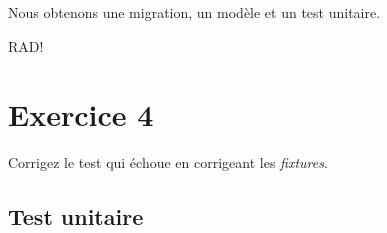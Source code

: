 Nous obtenons une migration, un modèle et un test unitaire.

\begin{english}

\begin{Shaded}
\begin{Highlighting}[]
\NormalTok{$ }\KeywordTok{\textbackslash{}}
     \KeywordTok{\textbackslash{}}
        \KeywordTok{\textbackslash{}}
        \KeywordTok{\textbackslash{}}
\end{Highlighting}
\end{Shaded}

\end{english}

RAD!

\hypertarget{exercice-4}{%
\section{Exercice 4}\label{exercice-4}}

Corrigez le test qui échoue en corrigeant les \emph{fixtures}.

\begin{english}

\begin{Shaded}
\begin{Highlighting}[]
\NormalTok{$ }

\NormalTok{$ }
\NormalTok{$ }
\NormalTok{$ }
\NormalTok{$ }

\NormalTok{$ }
\end{Highlighting}
\end{Shaded}

\end{english}

\hypertarget{test-unitaire}{%
\subsection{Test unitaire}\label{test-unitaire}}

